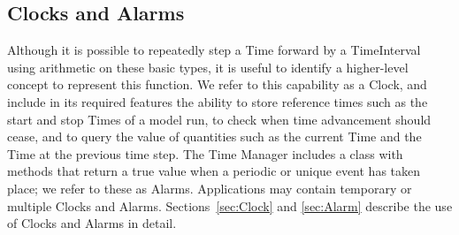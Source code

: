 \subsection{Clocks and Alarms}
Although it is possible to repeatedly step a Time forward by a 
TimeInterval using arithmetic on these basic types, it is useful to 
identify a higher-level concept to represent this function.  We refer to 
this capability as a Clock, and include in its required features the 
ability to store reference times such as the start and stop Times of 
a model run, to check when time advancement should cease, 
and to query the value of quantities such as the current Time and the
Time at the previous time step.  The Time Manager includes a class 
with methods that return a true value when a periodic or unique event 
has taken place; we refer to these as Alarms.  Applications may contain 
temporary or multiple Clocks and Alarms.  Sections~\ref{sec:Clock} and
\ref{sec:Alarm} describe the use of Clocks and Alarms in detail.






